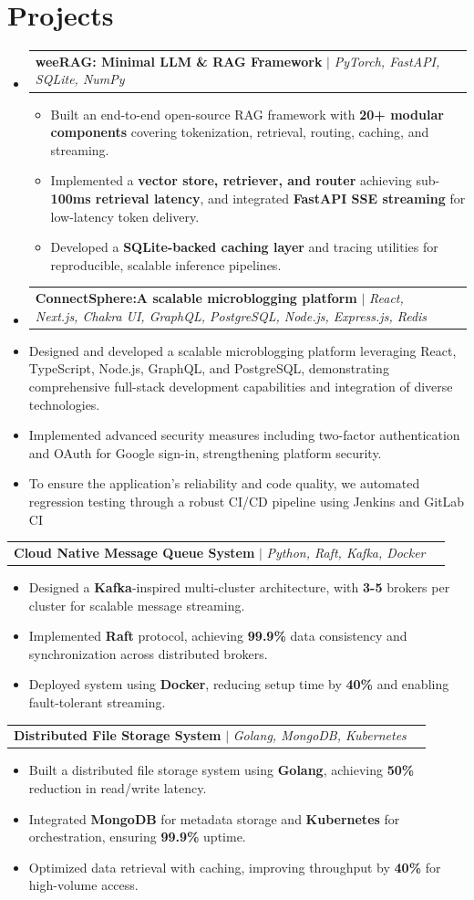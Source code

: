\documentclass[letterpaper,10pt]{article}
\makeatletter
\newcommand{\resumeItem}[1]{
  \item[$\vcenter{\hbox{\tiny$\bullet$}}$]\small{
    #1 \vspace{-2pt}
  }
}
\newcommand{\resumeProjectHeading}[2]{
  \item
  \begin{tabular*}{0.97\textwidth}{l@{\extracolsep{\fill}}r}
    \small#1 & #2 \\
  \end{tabular*}\vspace{-7pt}
}
\newcommand{\resumeSubHeadingListStart}{\begin{itemize}[leftmargin=0.15in, label={}]}
\newcommand{\resumeItemListStart}{\begin{itemize}}
\newcommand{\resumeItemListEnd}{\end{itemize}\vspace{-5pt}}
\makeatother
\begin{document}
\vspace{-3pt}
\section{\textbf{Projects}}
\resumeSubHeadingListStart

\resumeProjectHeading
{\textbf{weeRAG: Minimal LLM \& RAG Framework} $|$ \emph{PyTorch, FastAPI, SQLite, NumPy}}{}
\resumeItemListStart
\resumeItem{Built an end-to-end open-source RAG framework with \textbf{20+ modular components} covering tokenization, retrieval, routing, caching, and streaming.}
\resumeItem{Implemented a \textbf{vector store, retriever, and router} achieving sub-\textbf{100ms retrieval latency}, and integrated \textbf{FastAPI SSE streaming} for low-latency token delivery.}
\resumeItem{Developed a \textbf{SQLite-backed caching layer} and tracing utilities for reproducible, scalable inference pipelines.}
\resumeItemListEnd


\resumeProjectHeading
         {\textbf{ConnectSphere:A scalable microblogging platform} $|$ \footnotesize\emph{React, Next.js, Chakra UI, GraphQL, PostgreSQL, Node.js, Express.js, Redis}}

        \resumeItemListStart
            \resumeItem{Designed and developed a scalable microblogging platform leveraging React, TypeScript, Node.js, GraphQL, and PostgreSQL, demonstrating comprehensive full-stack development capabilities and integration of diverse technologies.}
            \resumeItem{Implemented advanced security measures including two-factor authentication and OAuth for Google sign-in, strengthening platform security.}
            \resumeItem{To ensure the application’s reliability and code quality, we automated regression testing through a robust CI/CD pipeline using Jenkins and GitLab CI}
        \resumeItemListEnd

\resumeProjectHeading
{\textbf{Cloud Native Message Queue System} $|$ \emph{Python, Raft, Kafka, Docker}}{}
\resumeItemListStart
  \resumeItem{Designed a \textbf{Kafka}-inspired multi-cluster architecture, with \textbf{3-5} brokers per cluster for scalable message streaming.}
  \resumeItem{Implemented \textbf{Raft} protocol, achieving \textbf{99.9\%} data consistency and synchronization across distributed brokers.}
  \resumeItem{Deployed system using \textbf{Docker}, reducing setup time by \textbf{40\%} and enabling fault-tolerant streaming.}
\resumeItemListEnd

\resumeProjectHeading
{\textbf{Distributed File Storage System} $|$ \emph{Golang, MongoDB, Kubernetes}}{}
\resumeItemListStart
  \resumeItem{Built a distributed file storage system using \textbf{Golang}, achieving \textbf{50\%} reduction in read/write latency.}
  \resumeItem{Integrated \textbf{MongoDB} for metadata storage and \textbf{Kubernetes} for orchestration, ensuring \textbf{99.9\%} uptime.}
  \resumeItem{Optimized data retrieval with caching, improving throughput by \textbf{40\%} for high-volume access.}
\resumeItemListEnd
        
\end{document}
